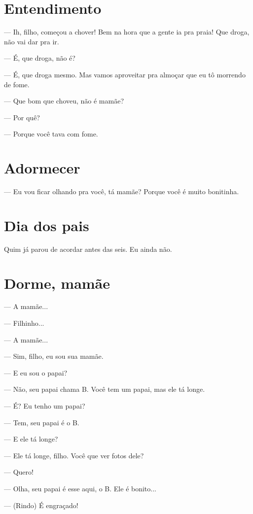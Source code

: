 {\chapter{Entendimento}\label{entendimento}

--- Ih, filho, começou a chover! Bem na hora que a gente ia pra praia!
Que droga, não vai dar pra ir.

--- É, que droga, não é?

--- É, que droga mesmo. Mas vamos aproveitar pra almoçar que eu tô
morrendo de fome.

--- Que bom que choveu, não é mamãe?

--- Por quê?

--- Porque você tava com fome.

\chapter{Adormecer}\label{adormecer}

--- Eu vou ficar olhando pra você, tá mamãe? Porque você é muito
bonitinha.

\chapter{Dia dos pais}\label{dia-dos-pais}

{Quim já parou de acordar antes das seis. Eu ainda
não.}

\chapter{Dorme, mamãe}\label{dorme-mamuxe3e}

--- A mamãe...

--- Filhinho...

--- A mamãe...

--- Sim, filho, eu sou sua mamãe.

--- E eu sou o papai?

--- Não, seu papai chama B. Você tem um papai, mas ele tá longe.

--- É? Eu tenho um papai?

--- Tem, seu papai é o B.

--- E ele tá longe?

--- Ele tá longe, filho. Você que ver fotos dele?

--- Quero!

--- Olha, seu papai é esse aqui, o B. Ele é bonito...

--- (Rindo) É engraçado!

}
